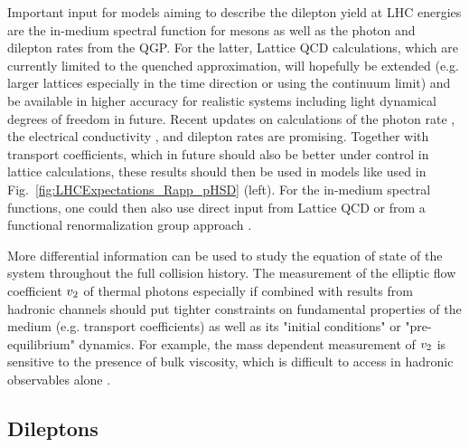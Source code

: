 \documentclass[../report.tex]{subfiles}
\begin{document}
Important input for models aiming to describe the dilepton yield at LHC energies are the in-medium spectral function for \Prho mesons as well as the photon and dilepton rates from the QGP. For the latter, Lattice QCD calculations, which are currently limited to the quenched approximation, will hopefully be extended (e.g. larger lattices especially in the time direction or using the continuum limit) and be available in higher accuracy for realistic systems including light dynamical degrees of freedom in future. Recent updates on calculations of the photon rate \cite{Ghiglieri:2016tvj}, the electrical conductivity \cite{Aarts:2014nba}, and dilepton rates \cite{Ding:2016hua} are promising. Together with transport coefficients, which in future should also be better under control in lattice calculations, these results should then be used in models like used in Fig.~\ref{fig:LHCExpectations_Rapp_pHSD} (left). For the in-medium spectral functions, one could then also use direct input from Lattice QCD \cite{Aarts:2005hg,Brandt:2015aqk} or from a functional renormalization group approach \cite{Jung:2016yxl}.

More differential information can be used to study the equation of state of the system throughout the full collision history. The measurement of the elliptic flow coefficient $v_{\rm 2}$ of thermal photons especially if combined with results from hadronic channels should put tighter constraints on fundamental properties of the medium (e.g. transport coefficients) as well as its "initial conditions" or "pre-equilibrium" dynamics. For example, the mass dependent measurement of  $v_{\rm 2}$ is sensitive to the presence of bulk viscosity, which is difficult to access in hadronic observables alone . 


\newpage


\newpage
\subsection{Dileptons}
\end{document}
